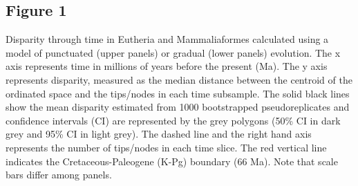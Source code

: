 \documentclass[10pt,letterpaper]{article}
\begin{document}

\subsection{Figure 1}
\label{fig:Fig_Raw_results}
Disparity through time in Eutheria and Mammaliaformes calculated using a model of punctuated (upper panels) or gradual (lower panels) evolution. The x axis represents time in millions of years before the present (Ma). The y axis represents disparity, measured as the median distance between the centroid of the ordinated space and the tips/nodes in each time subsample. The solid black lines show the mean disparity estimated from 1000 bootstrapped pseudoreplicates and confidence intervals (CI) are represented by the grey polygons (50\% CI in dark grey and 95\% CI in light grey). The dashed line and the right hand axis represents the number of tips/nodes in each time slice. The red vertical line indicates the Cretaceous-Paleogene (K-Pg) boundary (66 Ma). Note that scale bars differ among panels.
\end{document}
